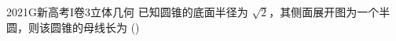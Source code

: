 
\begin{problem}{2021}{G}{新高考I卷}{3}{立体几何}
已知圆锥的底面半径为 $ \sqrt{2} $，其侧面展开图为一个半圆，则该圆锥的母线长为 (\hspace{1cm})
\end{problem}

\begin{choices}
\end{choices}